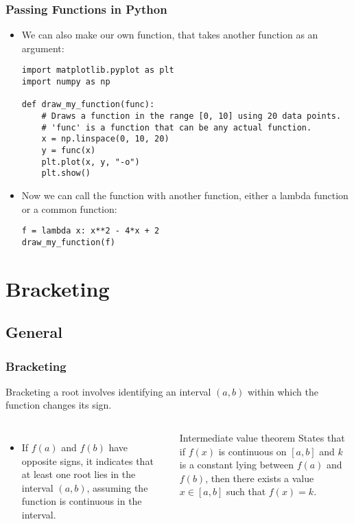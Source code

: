 \begin{frame}[fragile]
  \frametitle{Passing Functions in Python}

  \begin{itemize}
    \item We can also make our own function, that takes another function as an argument:
          \begin{lstlisting}
import matplotlib.pyplot as plt
import numpy as np

def draw_my_function(func):
    # Draws a function in the range [0, 10] using 20 data points.
    # 'func' is a function that can be any actual function.
    x = np.linspace(0, 10, 20)
    y = func(x)
    plt.plot(x, y, "-o")
    plt.show()
      \end{lstlisting}

    \item Now we can call the function with another function, either a lambda function or a common function:
          \begin{lstlisting}
f = lambda x: x**2 - 4*x + 2
draw_my_function(f)
      \end{lstlisting}
  \end{itemize}
\end{frame}

\section{Bracketing}
\subsection*{General}

{\nologo
\begin{frame}[fragile]
  \frametitle{Bracketing}
  Bracketing a root involves identifying an interval \((a, b)\) within which the function changes its sign.
  \begin{columns}
    \vspace{0.25cm}
    
    \vspace{0.25cm}
    
    \begin{itemize}
      \item If \(f(a)\) and \(f(b)\) have opposite signs, it indicates that at least one root lies in the interval \((a, b)\), assuming the function is continuous in the interval.
    \end{itemize}
    \begin{block}{Intermediate value theorem}
      States that if \(f(x)\) is continuous on \([a, b]\) and \(k\) is a constant lying between \(f(a)\) and \(f(b)\), then there exists a value \(x \in [a, b]\) such that \(f(x) = k\).
    \end{block}
  \end{columns}
\end{frame}
}

